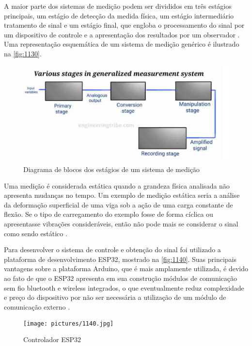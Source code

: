 A maior parte dos sistemas de medição podem ser divididos em três estágios principais, um estágio de detecção da medida física, um estágio intermediário tratamento de sinal e um estágio final,
que engloba o processamento do sinal por um dispositivo de controle e a apresentação dos resultados por um observador \autocite{Hollman2011}.
Uma representação esquemática de um sistema de medição genérico é ilustrado na \autoref{fig:1130}.

\begin{figure}[htb]
	\caption{\label{fig:1130} Diagrama de blocos dos estágios de um sistema de medição}
	\begin{center}
		\includegraphics[width=\textwidth]{pictures/1130.png}
	\end{center}
\end{figure}

Uma medição é considerada estática quando a grandeza física analisada não apresenta mudanças no tempo.
Um exemplo de medição estática seria a análise da deformação superficial de uma viga sob a ação de uma carga constante de flexão.
Se o tipo de carregamento do exemplo fosse de forma cíclica ou apresentasse vibrações consideráveis, então não pode mais se considerar o sinal como sendo estático \autocite{Hollman2011}.

Para desenvolver o sistema de controle e obtenção do sinal foi utilizado a plataforma de desenvolvimento ESP32, mostrado na \autoref{fig:1140}.
Suas principais vantagens sobre a plataforma Arduino, que é mais amplamente utilizada, é devido ao fato de que o ESP32 apresenta em sua construção módulos de comunicação sem fio bluetooth
e wireless integrados, o que eventualmente reduz complexidade e preço do dispositivo por não ser necessária a utilização de um módulo de comunicação externo \autocite{DocsESP32}.

\begin{figure}[htb]
	\caption{\label{fig:1140} Controlador ESP32}
	\begin{center}
		\texttt{[image: pictures/1140.jpg]}
	\end{center}
\end{figure}

